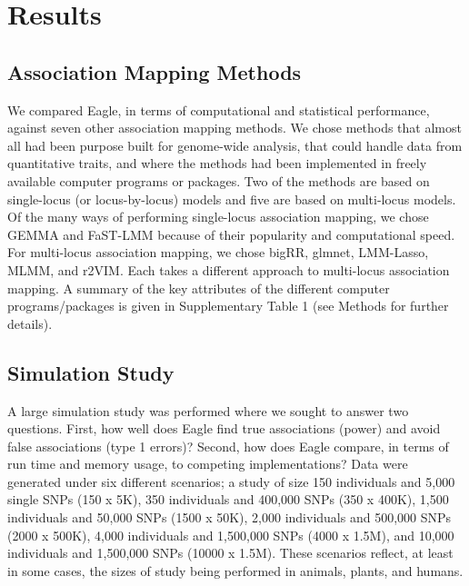 \documentclass{bioinfo}
\begin{document}
  
  

\section{Results}

\subsection{Association Mapping Methods}

We compared Eagle, in terms of computational and statistical performance, against seven other association mapping methods. 
We chose methods that almost all had been purpose built for genome-wide analysis, that could handle data from quantitative traits, and where the methods had been implemented in freely available computer programs or packages. Two of the methods are based on single-locus (or locus-by-locus) models and five are based on multi-locus models. Of the many ways of performing single-locus association mapping, we chose 
GEMMA and FaST-LMM  because of their popularity and computational speed. 
For multi-locus association mapping, we chose bigRR, glmnet, 
LMM-Lasso, MLMM, and r2VIM.  
Each takes a different approach to multi-locus association mapping. A summary of the key attributes of the different computer programs/packages 
is given in Supplementary Table 1 (see Methods for further details). 

 

\subsection{Simulation Study}
A large simulation study was performed where we sought to  answer two questions. 
First, how well does Eagle find true associations (power) and avoid 
false associations (type 1 errors)? Second, how does Eagle compare, in terms of run time and memory usage, to 
competing implementations? Data were generated under six different scenarios; a study of size 150 individuals 
and 5,000 single SNPs (150 x 5K),  350 individuals and 400,000 SNPs (350 x 400K),  1,500 individuals and 
50,000 SNPs (1500 x 50K), 2,000 individuals and 500,000 SNPs (2000 x 500K), 4,000 individuals and 
1,500,000 SNPs (4000 x 1.5M), and 10,000 individuals and 1,500,000 SNPs (10000 x 1.5M).   
These scenarios reflect, at least in some cases, the sizes of study being performed in animals, plants, and humans.  
\end{document}
